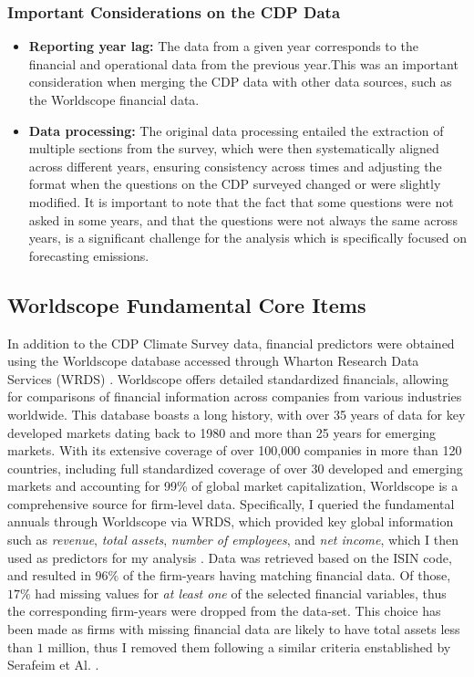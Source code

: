 \subsubsection{Important Considerations on the CDP Data}
\begin{itemize}
    \item \textbf{Reporting year lag:} The data from a given year corresponds to the financial and operational data from the previous year.This was an important consideration when merging the CDP data with other data sources, such as the Worldscope financial data.
    \item \textbf{Data processing:} The original data processing entailed the extraction of multiple sections from the survey, which were then systematically aligned across different years, ensuring consistency across times and adjusting the format when the questions on the CDP surveyed changed or were slightly modified. It is important to note that the fact that some questions were not asked in some years, and that the questions were not always the same across years, is a significant challenge for the analysis which is specifically focused on forecasting emissions.

\end{itemize}


\subsection{Worldscope Fundamental Core Items}
In addition to the CDP Climate Survey data, financial predictors were obtained using the Worldscope database \cite{Worldscope_2} accessed through Wharton Research Data Services (WRDS) \cite{WRDS}. Worldscope offers detailed standardized financials, allowing for comparisons of financial information across companies from various industries worldwide. This database boasts a long history, with over 35 years of data for key developed markets dating back to 1980 and more than 25 years for emerging markets. With its extensive coverage of over 100,000 companies in more than 120 countries, including full standardized coverage of over 30 developed and emerging markets and accounting for 99\% of global market capitalization, Worldscope is a comprehensive source for firm-level data. Specifically, I queried the fundamental annuals through Worldscope via WRDS, which provided key global information such as \textit{revenue}, \textit{total assets}, \textit{number of employees}, and \textit{net income}, which I then used as predictors for my analysis \cite{Worldscope_2}. Data was retrieved based on the ISIN code, and resulted in $96\%$ of the firm-years having matching financial data. Of those, $17\%$ had missing values for \textit{at least one} of the selected financial variables, thus the corresponding firm-years were dropped from the data-set. This choice has been made as firms with missing financial data are likely to have total assets less than $1$ million, thus I removed them following a similar criteria enstablished by Serafeim et Al. \cite{Serafeim2019}.

